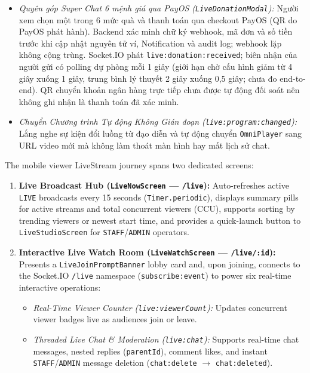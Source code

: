 {\begin{enumerate}[leftmargin=*,itemsep=2pt]
\begin{itemize}[leftmargin=*,itemsep=1pt]
    \item \emph{Quyên góp Super Chat 6 mệnh giá qua PayOS (\texttt{LiveDonationModal}):} Người xem chọn một trong 6 mức quà và thanh toán qua checkout PayOS (QR do PayOS phát hành). Backend xác minh chữ ký webhook, mã đơn và số tiền trước khi cập nhật nguyên tử ví, Notification và audit log; webhook lặp không cộng trùng. Socket.IO phát \texttt{live:donation:received}; biên nhận của người gửi có polling dự phòng mỗi 1 giây (giới hạn chờ cấu hình giảm từ 4 giây xuống 1 giây, trung bình lý thuyết 2 giây xuống 0,5 giây; chưa đo end-to-end). QR chuyển khoản ngân hàng trực tiếp chưa được tự động đối soát nên không ghi nhận là thanh toán đã xác minh.
    \item \emph{Chuyển Chương trình Tự động Không Gián đoạn (\texttt{live:program:changed}):} Lắng nghe sự kiện đổi luồng từ đạo diễn và tự động chuyển \texttt{OmniPlayer} sang URL video mới mà không làm thoát màn hình hay mất lịch sử chat.
  \end{itemize}
\end{enumerate}
}{
The mobile viewer LiveStream journey spans two dedicated screens:
\begin{enumerate}[leftmargin=*,itemsep=2pt]
  \item \textbf{Live Broadcast Hub (\texttt{LiveNowScreen} --- \texttt{/live}):} Auto-refreshes active \texttt{LIVE} broadcasts every 15 seconds (\texttt{Timer.periodic}), displays summary pills for active streams and total concurrent viewers (CCU), supports sorting by trending viewers or newest start time, and provides a quick-launch button to \texttt{LiveStudioScreen} for \texttt{STAFF}/\texttt{ADMIN} operators.
  \item \textbf{Interactive Live Watch Room (\texttt{LiveWatchScreen} --- \texttt{/live/:id}):} Presents a \texttt{LiveJoinPromptBanner} lobby card and, upon joining, connects to the Socket.IO \texttt{/live} namespace (\texttt{subscribe:event}) to power six real-time interactive operations:
  \begin{itemize}[leftmargin=*,itemsep=1pt]
    \item \emph{Real-Time Viewer Counter (\texttt{live:viewerCount}):} Updates concurrent viewer badges live as audiences join or leave.
    \item \emph{Threaded Live Chat \& Moderation (\texttt{live:chat}):} Supports real-time chat messages, nested replies (\texttt{parentId}), comment likes, and instant \texttt{STAFF}/\texttt{ADMIN} message deletion (\texttt{chat:delete} $\rightarrow$ \texttt{chat:deleted}).

\end{itemize}
\end{enumerate}}
